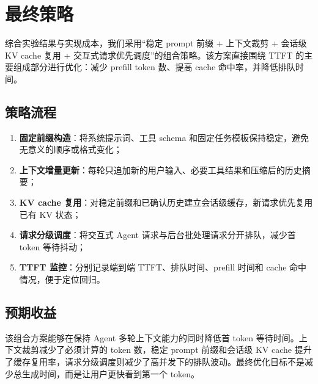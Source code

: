 \section{最终策略}

综合实验结果与实现成本，我们采用“稳定 prompt 前缀 + 上下文裁剪 + 会话级 KV cache 复用 + 交互式请求优先调度”的组合策略。该方案直接围绕 TTFT 的主要组成部分进行优化：减少 prefill token 数、提高 cache 命中率，并降低排队时间。

\subsection{策略流程}

\begin{enumerate}
  \item \textbf{固定前缀构造}：将系统提示词、工具 schema 和固定任务模板保持稳定，避免无意义的顺序或格式变化；
  \item \textbf{上下文增量更新}：每轮只追加新的用户输入、必要工具结果和压缩后的历史摘要；
  \item \textbf{KV cache 复用}：对稳定前缀和已确认历史建立会话级缓存，新请求优先复用已有 KV 状态；
  \item \textbf{请求分级调度}：将交互式 Agent 请求与后台批处理请求分开排队，减少首 token 等待抖动；
  \item \textbf{TTFT 监控}：分别记录端到端 TTFT、排队时间、prefill 时间和 cache 命中情况，便于定位回归。
\end{enumerate}

\subsection{预期收益}

该组合方案能够在保持 Agent 多轮上下文能力的同时降低首 token 等待时间。上下文裁剪减少了必须计算的 token 数，稳定 prompt 前缀和会话级 KV cache 提升了缓存复用率，请求分级调度则减少了高并发下的排队波动。最终优化目标不是减少总生成时间，而是让用户更快看到第一个 token。
